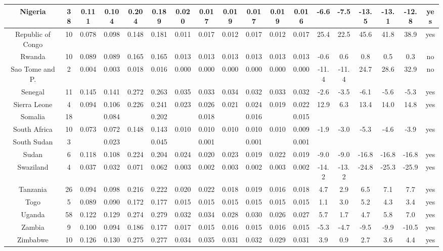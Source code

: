 \documentclass[10pt]{article}
\begin{document}
\begin{center}
\begin{tabular}{|c|c|c|c|c|c|c|c|c|c|c|c|c|c|c|c|c|c|}
\hline
Nigeria & 38 & 0.111 & 0.104 & 0.204 & 0.189 & 0.020 & 0.017 & 0.019 & 0.017 & 0.019 & 0.016 & -6.6 & -7.5 & -13.5 & -13.1 & -12.8 & yes \\
\hline
Republic of Congo & 10 & 0.078 & 0.098 & 0.148 & 0.181 & 0.011 & 0.017 & 0.012 & 0.017 & 0.012 & 0.017 & 25.4 & 22.5 & 45.6 & 41.8 & 38.9 & yes \\
\hline
Rwanda & 10 & 0.089 & 0.089 & 0.165 & 0.165 & 0.013 & 0.013 & 0.013 & 0.013 & 0.013 & 0.013 & -0.6 & 0.6 & 0.8 & 0.5 & 0.3 & no \\
\hline
Sao Tome and P. & 2 & 0.004 & 0.003 & 0.018 & 0.016 & 0.000 & 0.000 & 0.000 & 0.000 & 0.000 & 0.000 & -11.4 & -11.4 & 24.7 & 28.6 & 32.9 & no \\
\hline
Senegal & 11 & 0.145 & 0.141 & 0.272 & 0.263 & 0.035 & 0.033 & 0.034 & 0.032 & 0.033 & 0.032 & -2.6 & -3.5 & -6.1 & -5.6 & -5.3 & yes \\
\hline
Sierra Leone & 4 & 0.094 & 0.106 & 0.226 & 0.241 & 0.023 & 0.026 & 0.021 & 0.024 & 0.019 & 0.022 & 12.9 & 6.3 & 13.4 & 14.0 & 14.8 & yes \\
\hline
Somalia & 18 &  & 0.084 &  & 0.202 &  & 0.018 &  & 0.016 &  & 0.015 &  &  &  &  &  &  \\
\hline
South Africa & 10 & 0.073 & 0.072 & 0.148 & 0.143 & 0.010 & 0.010 & 0.010 & 0.010 & 0.010 & 0.009 & -1.9 & -3.0 & -5.3 & -4.6 & -3.9 & yes \\
\hline
South Sudan & 3 &  & 0.023 &  & 0.045 &  & 0.001 &  & 0.001 &  & 0.001 &  &  &  &  &  &  \\
\hline
Sudan & 6 & 0.118 & 0.108 & 0.224 & 0.204 & 0.024 & 0.020 & 0.023 & 0.019 & 0.022 & 0.019 & -9.0 & -9.0 & -16.8 & -16.8 & -16.8 & yes \\
\hline
Swaziland & 4 & 0.037 & 0.032 & 0.071 & 0.062 & 0.003 & 0.002 & 0.003 & 0.002 & 0.003 & 0.002 & -14.2 & -13.2 & -24.8 & -25.3 & -25.9 & yes \\
\hline
Tanzania & 26 & 0.094 & 0.098 & 0.216 & 0.222 & 0.020 & 0.022 & 0.018 & 0.019 & 0.016 & 0.018 & 4.7 & 2.9 & 6.5 & 7.1 & 7.7 & yes \\
\hline
Togo & 5 & 0.089 & 0.090 & 0.172 & 0.177 & 0.015 & 0.015 & 0.015 & 0.015 & 0.015 & 0.015 & 1.1 & 3.0 & 5.2 & 4.3 & 3.4 & yes \\
\hline
Uganda & 58 & 0.122 & 0.129 & 0.274 & 0.279 & 0.032 & 0.034 & 0.028 & 0.030 & 0.026 & 0.027 & 5.7 & 1.7 & 4.7 & 5.8 & 7.0 & yes \\
\hline
Zambia & 9 & 0.100 & 0.094 & 0.186 & 0.177 & 0.017 & 0.015 & 0.016 & 0.015 & 0.016 & 0.015 & -5.3 & -4.7 & -9.5 & -9.9 & -10.5 & yes \\
\hline
Zimbabwe & 10 & 0.126 & 0.130 & 0.275 & 0.277 & 0.034 & 0.035 & 0.031 & 0.032 & 0.029 & 0.031 & 3.9 & 0.9 & 2.7 & 3.6 & 4.4 & yes \\
\hline
\end{tabular}
\end{center}
\end{document}
